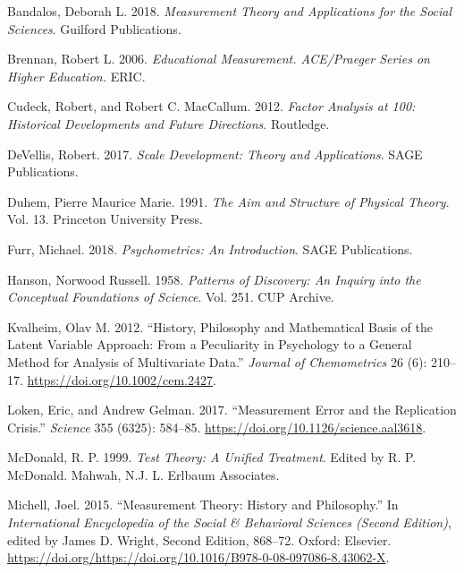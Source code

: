 \documentclass[11pt,]{article}
\begin{document}
\newpage

\hypertarget{refs}{}
\leavevmode\hypertarget{ref-Bandalos2018}{}%
Bandalos, Deborah L. 2018. \emph{Measurement Theory and Applications for
the Social Sciences}. Guilford Publications.

\leavevmode\hypertarget{ref-Brennan2006}{}%
Brennan, Robert L. 2006. \emph{Educational Measurement. ACE/Praeger
Series on Higher Education.} ERIC.

\leavevmode\hypertarget{ref-Cudeck2012}{}%
Cudeck, Robert, and Robert C. MacCallum. 2012. \emph{Factor Analysis at
100: Historical Developments and Future Directions}. Routledge.

\leavevmode\hypertarget{ref-DeVellis2017}{}%
DeVellis, Robert. 2017. \emph{Scale Development: Theory and
Applications}. SAGE Publications.

\leavevmode\hypertarget{ref-Duhem1991}{}%
Duhem, Pierre Maurice Marie. 1991. \emph{The Aim and Structure of
Physical Theory}. Vol. 13. Princeton University Press.

\leavevmode\hypertarget{ref-Furr2018}{}%
Furr, Michael. 2018. \emph{Psychometrics: An Introduction}. SAGE
Publications.

\leavevmode\hypertarget{ref-Hanson1958}{}%
Hanson, Norwood Russell. 1958. \emph{Patterns of Discovery: An Inquiry
into the Conceptual Foundations of Science}. Vol. 251. CUP Archive.

\leavevmode\hypertarget{ref-Kvalheim2012}{}%
Kvalheim, Olav M. 2012. ``History, Philosophy and Mathematical Basis of
the Latent Variable Approach: From a Peculiarity in Psychology to a
General Method for Analysis of Multivariate Data.'' \emph{Journal of
Chemometrics} 26 (6): 210--17. \url{https://doi.org/10.1002/cem.2427}.

\leavevmode\hypertarget{ref-Loken2017}{}%
Loken, Eric, and Andrew Gelman. 2017. ``Measurement Error and the
Replication Crisis.'' \emph{Science} 355 (6325): 584--85.
\url{https://doi.org/10.1126/science.aal3618}.

\leavevmode\hypertarget{ref-McDonald1999}{}%
McDonald, R. P. 1999. \emph{Test Theory: A Unified Treatment}. Edited by
R. P. McDonald. Mahwah, N.J. L. Erlbaum Associates.

\leavevmode\hypertarget{ref-Michell2015}{}%
Michell, Joel. 2015. ``Measurement Theory: History and Philosophy.'' In
\emph{International Encyclopedia of the Social \& Behavioral Sciences
(Second Edition)}, edited by James D. Wright, Second Edition, 868--72.
Oxford: Elsevier.
\url{https://doi.org/https://doi.org/10.1016/B978-0-08-097086-8.43062-X}.
\end{document}
